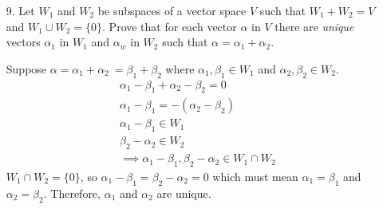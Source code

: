 \documentclass{article}
\begin{document}
\begin{enumerate}[listparindent=\parindent]
\item[9.] Let \(W_1\) and \(W_2\) be subspaces of a vector space \(V\) such that \(W_1 + W_2 = V\)
    and \(W_1 \cup W_2 = \{0\}\). Prove that for each vector \(\alpha\) in \(V\) there are
    \textit{unique} vectors \(\alpha_1\) in \(W_1\) and \(\alpha_w\) in \(W_2\) such that \(\alpha = \alpha_1 + \alpha_2\).

    Suppose \(\alpha = \alpha_1 + \alpha_2\ = \beta_1 + \beta_2\) where \(\alpha_1, \beta_1 \in W_1\) and \(\alpha_2, \beta_2 \in W_2\).
    \begin{gather*}
        \alpha_1 - \beta_1 + \alpha_2 - \beta_2 = 0 \\
        \alpha_1 - \beta_1 = -(\alpha_2 - \beta_2) \\
        \alpha_1 - \beta_1 \in W_1 \\
        \beta_2 - \alpha_2 \in W_2 \\
        \implies \alpha_1 - \beta_1, \beta_2 - \alpha_2 \in W_1 \cap W_2
    \end{gather*}
    \(W_1 \cap W_2 = \{0\}\), so \(\alpha_1 - \beta_1 = \beta_2 - \alpha_2 = 0\)
    which must mean \(\alpha_1 = \beta_1\) and \(\alpha_2 = \beta_2\).
    Therefore, \(\alpha_1\) and \(\alpha_2\) are unique.
\end{enumerate}
\end{document}
